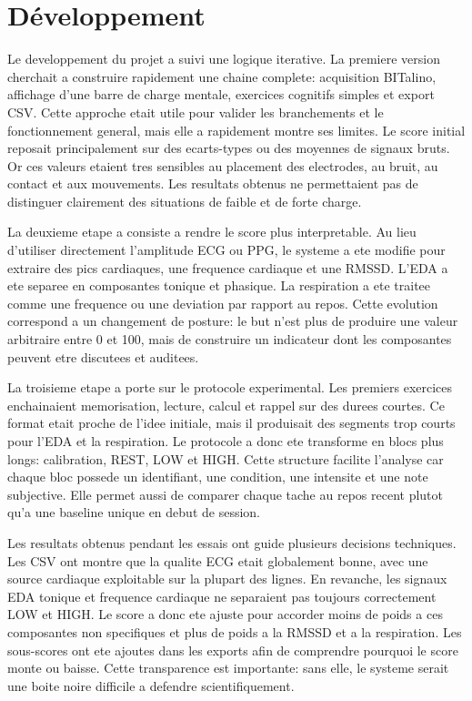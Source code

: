\documentclass[runningheads]{llncs}
\begin{document}
\section{Développement}

Le developpement du projet a suivi une logique iterative. La premiere version cherchait a construire rapidement une chaine complete: acquisition BITalino, affichage d'une barre de charge mentale, exercices cognitifs simples et export CSV. Cette approche etait utile pour valider les branchements et le fonctionnement general, mais elle a rapidement montre ses limites. Le score initial reposait principalement sur des ecarts-types ou des moyennes de signaux bruts. Or ces valeurs etaient tres sensibles au placement des electrodes, au bruit, au contact et aux mouvements. Les resultats obtenus ne permettaient pas de distinguer clairement des situations de faible et de forte charge.

La deuxieme etape a consiste a rendre le score plus interpretable. Au lieu d'utiliser directement l'amplitude ECG ou PPG, le systeme a ete modifie pour extraire des pics cardiaques, une frequence cardiaque et une RMSSD. L'EDA a ete separee en composantes tonique et phasique. La respiration a ete traitee comme une frequence ou une deviation par rapport au repos. Cette evolution correspond a un changement de posture: le but n'est plus de produire une valeur arbitraire entre 0 et 100, mais de construire un indicateur dont les composantes peuvent etre discutees et auditees.

La troisieme etape a porte sur le protocole experimental. Les premiers exercices enchainaient memorisation, lecture, calcul et rappel sur des durees courtes. Ce format etait proche de l'idee initiale, mais il produisait des segments trop courts pour l'EDA et la respiration. Le protocole a donc ete transforme en blocs plus longs: calibration, REST, LOW et HIGH. Cette structure facilite l'analyse car chaque bloc possede un identifiant, une condition, une intensite et une note subjective. Elle permet aussi de comparer chaque tache au repos recent plutot qu'a une baseline unique en debut de session.

Les resultats obtenus pendant les essais ont guide plusieurs decisions techniques. Les CSV ont montre que la qualite ECG etait globalement bonne, avec une source cardiaque exploitable sur la plupart des lignes. En revanche, les signaux EDA tonique et frequence cardiaque ne separaient pas toujours correctement LOW et HIGH. Le score a donc ete ajuste pour accorder moins de poids a ces composantes non specifiques et plus de poids a la RMSSD et a la respiration. Les sous-scores ont ete ajoutes dans les exports afin de comprendre pourquoi le score monte ou baisse. Cette transparence est importante: sans elle, le systeme serait une boite noire difficile a defendre scientifiquement.
\end{document}
